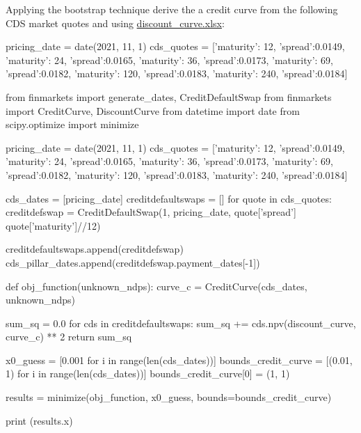 \cprotEnv\begin{question}
Applying the bootstrap technique derive the a credit curve from the following CDS market quotes and using \href{https://github.com/matteosan1/finance_course/raw/develop/libro/input_files/discount_curve.xlsx}{discount\_curve.xlsx}:

\begin{ipython}
pricing_date = date(2021, 11, 1)
cds_quotes = [{'maturity': 12, 'spread':0.0149},
              {'maturity': 24, 'spread':0.0165},
              {'maturity': 36, 'spread':0.0173},
              {'maturity': 69, 'spread':0.0182},
              {'maturity': 120, 'spread':0.0183},
              {'maturity': 240, 'spread':0.0184}]
\end{ipython}
\end{question}

\cprotEnv\begin{solution}
\begin{ipython}
from finmarkets import generate_dates, CreditDefaultSwap
from finmarkets import CreditCurve, DiscountCurve
from datetime import date
from scipy.optimize import minimize

pricing_date = date(2021, 11, 1)
cds_quotes = [{'maturity': 12, 'spread':0.0149},
              {'maturity': 24, 'spread':0.0165},
              {'maturity': 36, 'spread':0.0173},
              {'maturity': 69, 'spread':0.0182},
              {'maturity': 120, 'spread':0.0183},
              {'maturity': 240, 'spread':0.0184}]

cds_dates = [pricing_date]
creditdefaultswaps = []
for quote in cds_quotes:
    creditdefswap = CreditDefaultSwap(1, pricing_date, 
                                      quote['spread']
                                      quote['maturity']//12)
        
    creditdefaultswaps.append(creditdefswap)
    cds_pillar_dates.append(creditdefswap.payment_dates[-1])

def obj_function(unknown_ndps):
    curve_c = CreditCurve(cds_dates, unknown_ndps)

    sum_sq = 0.0
    for cds in creditdefaultswaps:
        sum_sq += cds.npv(discount_curve, curve_c) ** 2
    return sum_sq

x0_guess = [0.001 for i in range(len(cds_dates))]
bounds_credit_curve = [(0.01, 1) for i in range(len(cds_dates))]
bounds_credit_curve[0] = (1, 1)

results = minimize(obj_function, x0_guess, bounds=bounds_credit_curve)

print (results.x)
\end{ipython}
\begin{ioutput}
[1. 0.90681257 0.80416782 0.70889095 0.54479309 0.29706549
0.08665777]
\end{ioutput}
\end{solution}

